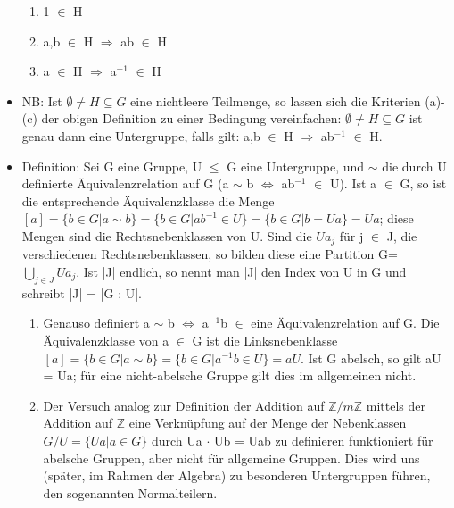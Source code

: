 \begin{itemize}
\begin{enumerate}
\item 1 $\in$ H
\item a,b $\in$ H $\Rightarrow$ ab $\in$ H
\item a $\in$ H $\Rightarrow$ a$^{-1}$ $\in$ H
\end{enumerate}
\item NB: Ist $\emptyset \neq H \subseteq G$ eine nichtleere Teilmenge, so lassen sich die Kriterien (a)-(c) der obigen Definition zu einer Bedingung vereinfachen: 
$\emptyset \neq H \subseteq G$ ist genau dann eine Untergruppe, falls gilt: a,b $\in$ H $\Rightarrow$ ab$^{-1}$ $\in$ H.
\item Definition: Sei G eine Gruppe, U $\le$ G eine Untergruppe, und $\sim$ die durch U definierte Äquivalenzrelation auf G (a $\sim$ b $\Leftrightarrow$ ab$^{-1}$ $\in$ U). Ist a $\in$ G, so ist die entsprechende Äquivalenzklasse die Menge 
$[a]=\{ b \in G | a \sim b \} = \{ b \in G | ab^{-1} \in U \} = \{ b \in G | b = Ua \} = Ua$; 
diese Mengen sind die Rechtsnebenklassen von U. Sind die $Ua_j$ für j $\in$ J, die verschiedenen Rechtsnebenklassen, so bilden diese eine Partition G=$\bigcup\limits_{j \in J} Ua_j$.
Ist |J| endlich, so nennt man |J| den Index von U in G und schreibt |J| = |G : U|.
\begin{enumerate}
\item Genauso definiert a $\sim$ b $\Leftrightarrow$ a$^{-1}$b $\in$ eine Äquivalenzrelation auf G. Die Äquivalenzklasse von a $\in$ G ist die Linksnebenklasse $[a] = \{b \in G | a \sim b \} = \{ b \in G | a^{-1}b \in U \} = aU$. 
Ist G abelsch, so gilt aU = Ua; für eine nicht-abelsche Gruppe gilt dies im allgemeinen nicht.
\item Der Versuch analog zur Definition der Addition auf $\mathbb{Z}/m\mathbb{Z}$ mittels der Addition auf $\mathbb{Z}$ eine Verknüpfung auf der Menge der Nebenklassen $G/U = \{Ua | a \in G\}$ durch Ua $\cdot$ Ub = Uab zu definieren funktioniert für abelsche Gruppen, aber nicht für allgemeine Gruppen. Dies wird uns (später, im Rahmen der Algebra) zu besonderen Untergruppen führen, den sogenannten Normalteilern.
\end{enumerate}
\end{itemize}

